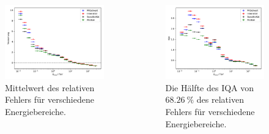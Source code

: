 \documentclass[aspectratio=1610, professionalfonts, 9pt]{beamer}
\begin{document}
  \begin{frame}
    \begin{columns}
      \begin{figure}
        \includegraphics[width=\textwidth]{pictures/RF_weights_bias.pdf}
        \caption{Mittelwert des relativen Fehlers für verschiedene Energiebereiche.}
        \label{}
      \end{figure}
      \begin{figure}
        \includegraphics[width=\textwidth]{pictures/RF_weights_resolution.pdf}
        \caption{Die Hälfte des IQA von $\SI{68,26}{\percent}$ des relativen Fehlers für verschiedene Energiebereiche.}
        \label{}
      \end{figure}
    \end{columns}
  \end{frame}
\end{document}
